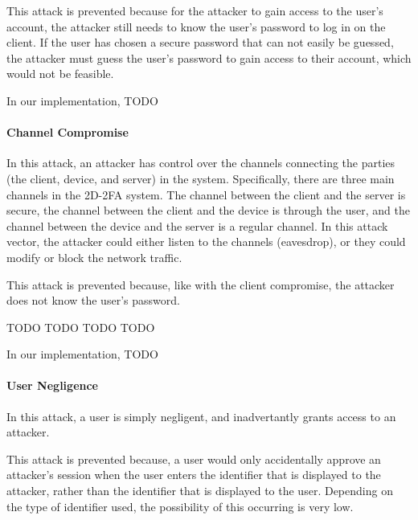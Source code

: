 \documentclass[11pt]{article} %
\begin{document}
This attack is prevented because for the attacker to gain access to the
user's account, the attacker still needs to know the user's password to
log in on the client. If the user has chosen a secure password that can
not easily be guessed, the attacker must guess the user's password to
gain access to their account, which would not be feasible. 

In our implementation, TODO

\paragraph{Channel Compromise}
In this attack, an attacker has control over the channels connecting the
parties (the client, device, and server) in the system. Specifically,
there are three main channels in the 2D-2FA system. The channel between
the client and the server is secure, the channel between the client and
the device is through the user, and the channel between the device and
the server is a regular channel. In this attack vector, the attacker
could either listen to the channels (eavesdrop), or they could modify or
block the network traffic. 

This attack is prevented because, like with the client compromise, the
attacker does not know the user's password. 

TODO TODO TODO TODO

In our implementation, TODO


\paragraph{User Negligence}
In this attack, a user is simply negligent, and inadvertantly grants
access to an attacker. 

This attack is prevented because, a user would only accidentally approve
an attacker's session when the user enters the identifier that is
displayed to the attacker, rather than the identifier that is displayed
to the user. Depending on the type of identifier used, the possibility
of this occurring is very low.
\end{document}
